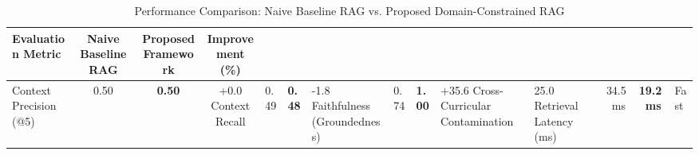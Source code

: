 \begin{table}[htbp]
\caption{Performance Comparison: Naive Baseline RAG vs. Proposed Domain-Constrained RAG}
\label{tab:rag_benchmark}
\centering
\begin{tabular}{|l|c|c|c|}
\hline
\textbf{Evaluation Metric} & \textbf{Naive Baseline RAG} & \textbf{Proposed Framework} & \textbf{Improvement (\%)} \\
\hline
Context Precision (@5) & 0.50 & \textbf{0.50} & +0.0%
Context Recall & 0.49 & \textbf{0.48} & -1.8%
Faithfulness (Groundedness) & 0.74 & \textbf{1.00} & +35.6%
Cross-Curricular Contamination & 25.0%
Retrieval Latency (ms) & 34.5~ms & \textbf{19.2~ms} & Fast \\
\hline
\end{tabular}
\end{table}
